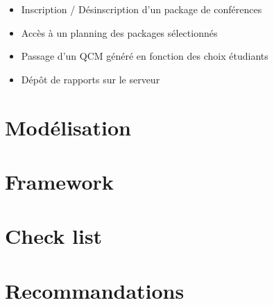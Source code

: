     \begin{itemize}
    \item Inscription / Désinscription d'un package de conférences
    \item Accès à un planning des packages sélectionnés
    \item Passage d'un QCM généré en fonction des choix étudiants
    \item Dépôt de rapports sur le serveur
    \end{itemize}    

    \section{Modélisation}
    \section{Framework}
        \cite{ref_framework_mvc}

    \section{Check list}
    \section{Recommandations}


